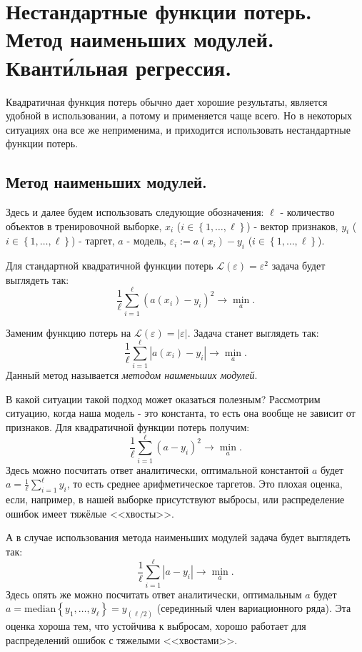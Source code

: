 \section*{Нестандартные функции потерь. Метод наименьших модулей. Квант\'{и}льная регрессия.}

Квадратичная функция потерь обычно дает хорошие результаты, является удобной в использовании, а потому и применяется чаще всего. Но в некоторых ситуациях она все же неприменима, и приходится использовать нестандартные функции потерь.

\subsection*{Метод наименьших модулей.}

Здесь и далее будем использовать следующие обозначения: $\ell$ - количество объектов в тренировочной выборке, $x_i$ ($i \in \left\{1, \dotsc, \ell \right\}$) - вектор признаков, $y_i$ ($i \in \left\{1, \dotsc, \ell \right\}$) - таргет, $a$ - модель, $\varepsilon_i := a(x_i) - y_i$ ($i \in \left\{1, \dotsc, \ell \right\}$).

Для стандартной квадратичной функции потерь $\mathscr{L}(\varepsilon) = \varepsilon^2$ задача будет выглядеть так:
$$\frac{1}{\ell}\sum\limits_{i=1}^\ell\left(a(x_i) - y_i\right)^2 \longrightarrow \min\limits_{a}.$$

Заменим функцию потерь на $\mathscr{L}(\varepsilon) = |\varepsilon|$.
Задача станет выглядеть так:
$$\frac{1}{\ell}\sum\limits_{i=1}^\ell\left|a(x_i) - y_i\right| \longrightarrow \min\limits_{a}.$$
Данный метод называется \textit{методом наименьших модулей}.

В какой ситуации такой подход может оказаться полезным? Рассмотрим ситуацию,  когда наша модель - это константа, то есть она вообще не зависит от признаков. Для квадратичной функции потерь получим:
$$\frac{1}{\ell}\sum\limits_{i=1}^\ell\left(a - y_i\right)^2 \longrightarrow \min\limits_{a}.$$
Здесь можно посчитать ответ аналитически, оптимальной константой $a$ будет $a = \frac{1}{\ell}\sum\limits_{i=1}^\ell y_i$, то есть среднее арифметическое таргетов. Это плохая оценка, если, например, в нашей выборке присутствуют выбросы, или распределение ошибок имеет тяжёлые <<хвосты>>.

А в случае использования метода наименьших модулей задача будет выглядеть так:
$$\frac{1}{\ell}\sum\limits_{i=1}^\ell\left|a - y_i\right| \longrightarrow \min\limits_{a}.$$
Здесь опять же можно посчитать ответ аналитически, оптимальным $a$ будет $a = \text{median}\left\{ y_1, \dotsc, y_\ell \right\} = y_{(\ell / 2)}$ (серединный член вариационного ряда). Эта оценка хороша тем, что устойчива к выбросам, хорошо работает для распределений ошибок с тяжелыми <<хвостами>>.

